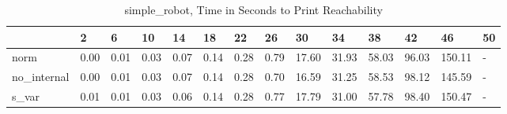 \begin{table}
\caption{simple_robot, Time in Seconds to Print Reachability}
\label{simple_robot_states_time}
\begin{tabular}{llllllllllllll}
\toprule
 & 2 & 6 & 10 & 14 & 18 & 22 & 26 & 30 & 34 & 38 & 42 & 46 & 50 \\
\midrule
norm & 0.00 & 0.01 & 0.03 & 0.07 & 0.14 & 0.28 & 0.79 & 17.60 & 31.93 & 58.03 & 96.03 & 150.11 & - \\
no_internal & 0.00 & 0.01 & 0.03 & 0.07 & 0.14 & 0.28 & 0.70 & 16.59 & 31.25 & 58.53 & 98.12 & 145.59 & - \\
s_var & 0.01 & 0.01 & 0.03 & 0.06 & 0.14 & 0.28 & 0.77 & 17.79 & 31.00 & 57.78 & 98.40 & 150.47 & - \\
\bottomrule
\end{tabular}
\end{table}
